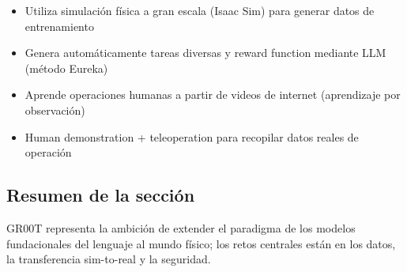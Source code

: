 \begin{itemize}
    \item Utiliza simulación física a gran escala (Isaac Sim) para generar datos de entrenamiento
    \item Genera automáticamente tareas diversas y reward function mediante LLM (método Eureka)
    \item Aprende operaciones humanas a partir de videos de internet (aprendizaje por observación)
    \item Human demonstration + teleoperation para recopilar datos reales de operación
\end{itemize}

\subsection{Resumen de la sección}

GR00T representa la ambición de extender el paradigma de los modelos fundacionales del lenguaje al mundo físico; los retos centrales están en los datos, la transferencia sim-to-real y la seguridad.
